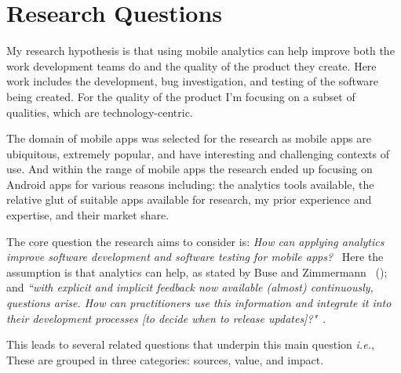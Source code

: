 \section{Research Questions}
\label{section-research-questions}

My research hypothesis is that using mobile analytics can help improve both the work development teams do and the quality of the product they create. Here work includes the development, bug investigation, and testing of the software being created. For the quality of the product I'm focusing on a subset of qualities, which are technology-centric.

The domain of mobile apps was selected for the research as mobile apps are ubiquitous, extremely popular, and have interesting and challenging contexts of use. And within the range of mobile apps the research ended up focusing on Android apps for various reasons including: the analytics tools available, the relative glut of suitable apps available for research, my prior experience and expertise, and their market share.

The core question the research aims to consider is: 
\emph{How can applying analytics improve software development and software testing for mobile apps?}~\label{overall-research-question}
Here the assumption is that analytics can help, as stated by Buse and Zimmermann ~(\citeyear{buse_analytics_2010}); and \emph{``with explicit and implicit feedback now available (almost) continuously, questions arise. How can practitioners use this information and integrate it into their development processes [to decide when to release updates]?"}~\citep{maalej2016_towards_data_driven_requirements_engineering}.

This leads to several related questions that underpin this main question \emph{i.e.}, These are grouped in three categories: sources, value, and impact.

